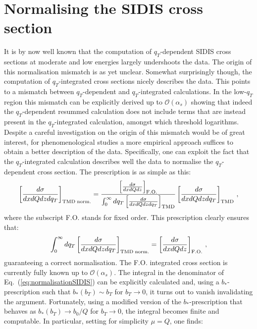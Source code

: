 \documentclass[10pt,a4paper]{article}
\begin{document}
\section{Normalising the SIDIS cross section}

It is by now well known that the computation of $q_T$-dependent SIDIS
cross sections at moderate and low energies largely undershoots the
data. The origin of this normalisation mismatch is as yet
unclear. Somewhat surprisingly though, the computation of
$q_T$-integrated cross sections nicely describes the data. This points
to a mismatch between $q_T$-dependent and $q_T$-integrated
calculations. In the low-$q_T$ region this mismatch can be explicitly
derived up to $\mathcal{O}(\alpha_s)$ showing that indeed the
$q_T$-dependent resummed calculation does not include terms that are
instead present in the $q_T$-integrated calculation, amongst which
threshold logarithms. Despite a careful investigation on the origin of
this mismatch would be of great interest, for phenomenological studies
a more empirical approach suffices to obtain a better description of
the data. Specifically, one can exploit the fact that the
$q_T$-integrated calculation describes well the data to normalise the
$q_T$-dependent cross section. The prescription is as simple as this:
\begin{equation}
\left[\frac{d\sigma}{dxdQdz d q_T}\right]_{\rm TMD\; norm.} =
\frac{\left[\frac{d\sigma}{dxdQdz}\right]_{\rm F.O.}}{\int_0^{\infty}
  dq_T\left[\frac{d\sigma}{dxdQdz d q_T}\right]_{\rm
    TMD}}\left[\frac{d\sigma}{dxdQdz d q_T}\right]_{\rm TMD}\,,
\label{eq:normalisationSIDIS}
\end{equation}
where the subscript F.O. stands for fixed order. This prescription
clearly ensures that:
\begin{equation}
\int_{0}^{\infty}dq_T\left[\frac{d\sigma}{dxdQdz d q_T}\right]_{\rm TMD\; norm.} =
\left[\frac{d\sigma}{dxdQdz}\right]_{\rm F.O.}\,,
\end{equation}
guaranteeing a correct normalisation. The F.O. integrated cross
section is currently fully known up to $\mathcal{O}(\alpha_s)$. The
integral in the denominator of Eq.~(\ref{eq:normalisationSIDIS}) can
be explicitly calculated and, using a $b_*$-prescription such that
$b_*(b_T)\sim b_T$ for $b_T\rightarrow 0$, it turns out to vanish
invalidating the argument. Fortunately, using a modified version of
the $b_*$-prescription that behaves as $b_*(b_T)\rightarrow b_0/Q$ for
$b_T\rightarrow 0$, the integral becomes finite and computable. In
particular, setting for simplicity $\mu=Q$, one finds:
\end{document}
